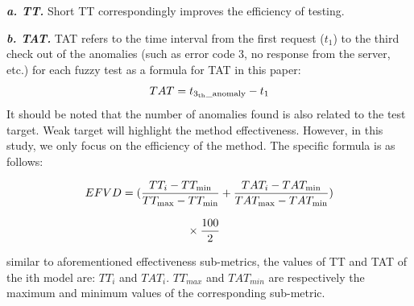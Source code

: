 \quad \textit{\textbf{a. TT.}} Short TT correspondingly improves the efficiency of testing.

\quad \textit{\textbf{b. TAT.}} TAT refers to the time interval from the first request (${t_1}$) to the third check out of the anomalies (such as error code 3, no response from the server, etc.) for each fuzzy test as a formula for TAT in this paper:
\begin{equation}
TAT={t_{{3_{{\rm{th}}}}\_{\rm{anomaly}}}} - {t_1}  
\end{equation}
It should be noted that the number of anomalies found is also related to the test target. Weak target will highlight the method effectiveness. However, in this study, we only focus on the efficiency of the method. The specific formula is as follows:

\begin{equation}
\begin{array}{l}
EFVD=(\displaystyle\frac{{T{T_i} - T{T_{\min }}}}{{T{T_{\max }} - T{T_{\min }}}} + \frac{{TA{T_i} - TA{T_{\min }}}}{{TA{T_{\max }} - TA{T_{\min }}}})\\
\\{\kern 1pt} {\kern 1pt} {\kern 1pt} {\kern 1pt} {\kern 1pt} {\kern 1pt} {\kern 1pt} {\kern 1pt} {\kern 1pt} {\kern 1pt} {\kern 1pt} {\kern 1pt} {\kern 1pt} {\kern 1pt} {\kern 1pt} {\kern 1pt} {\kern 1pt} {\kern 1pt} {\kern 1pt} {\kern 1pt} {\kern 1pt} {\kern 1pt} {\kern 1pt} {\kern 1pt} {\kern 1pt} {\kern 1pt} {\kern 1pt} {\kern 1pt} {\kern 1pt} {\kern 1pt} {\kern 1pt} {\kern 1pt} {\kern 1pt} {\kern 1pt} {\kern 1pt} {\kern 1pt} {\kern 1pt} {\kern 1pt} {\kern 1pt} {\kern 1pt} {\kern 1pt} {\kern 1pt} {\kern 1pt} {\kern 1pt} {\kern 1pt} {\kern 1pt} {\kern 1pt} {\kern 1pt} {\kern 1pt} {\kern 1pt} {\kern 1pt} {\kern 1pt} {\kern 1pt} {\kern 1pt} {\kern 1pt} {\kern 1pt} {\kern 1pt} {\kern 1pt} {\kern 1pt} {\kern 1pt} {\kern 1pt} {\kern 1pt} {\kern 1pt} {\kern 1pt} {\kern 1pt} {\kern 1pt} {\kern 1pt} {\kern 1pt} {\kern 1pt} {\kern 1pt} {\kern 1pt} {\kern 1pt} {\kern 1pt} {\kern 1pt} {\kern 1pt} {\kern 1pt} {\kern 1pt} {\kern 1pt} {\kern 1pt} {\kern 1pt} {\kern 1pt} {\kern 1pt} {\kern 1pt} {\kern 1pt} {\kern 1pt} {\kern 1pt} {\kern 1pt}  {\kern 1pt} {\kern 1pt} {\kern 1pt}  
\times \displaystyle\frac{{100}}{2}{\kern 1pt}
\end{array}
\end{equation}

similar to aforementioned effectiveness sub-metrics, the values of TT and TAT of the ith model are: ${TT_i}$ and ${TAT_i}$. ${{TT}_{max}}$ and ${{TAT}_{min}}$ are respectively the maximum and minimum values of the corresponding sub-metric.

